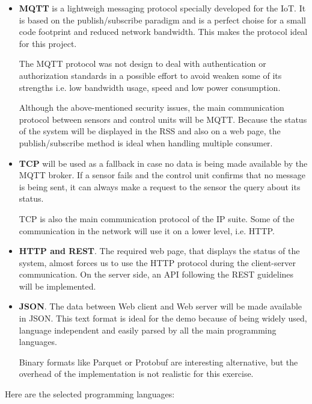 \documentclass[11pt]{article}
\begin{document}
\begin{itemize}
	\item \textbf{MQTT} is a lightweigh messaging protocol specially developed for the IoT. It is based on the publish/subscribe paradigm and is a perfect choise for a small code footprint and reduced network bandwidth. This makes the protocol ideal for this project.
	
The MQTT protocol was not design to deal with authentication or authorization standards in a possible effort to avoid weaken some of its strengths i.e. low bandwidth usage, speed and low power consumption.

Although the above-mentioned security issues, the main communication protocol between sensors and control units will be MQTT. Because the status of the system will be displayed in the RSS and also on a web page, the publish/subscribe method is ideal when handling multiple consumer.

	\item \textbf{TCP} will be used as a fallback in case no data is being made available by the MQTT broker. If a sensor fails and the control unit confirms that no message is being sent, it can always make a request to the sensor the query about its status.

TCP is also the main communication protocol of the IP suite. Some of the communication in the network will use it on a lower level, i.e. HTTP.

	\item \textbf{HTTP and REST}. The required web page, that displays the status of the system, almost forces us to use the HTTP protocol during the client-server communication. On the server side, an API following the REST guidelines will be implemented.

	\item \textbf{JSON}. The data between Web client and Web server will be made available in JSON. This text format is ideal for the demo because of being widely used, language independent and easily parsed by all the main programming languages.

	Binary formats like Parquet or Protobuf are interesting alternative, but the overhead of the implementation is not realistic for this exercise.
	
\end{itemize}

Here are the selected programming languages:
\end{document}
